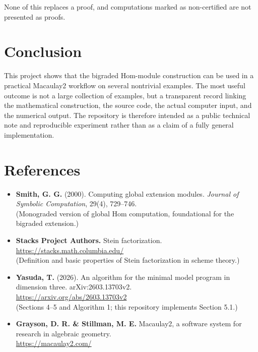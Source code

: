 \documentclass[11pt,reqno]{amsart}
\theoremstyle{plain}
\theoremstyle{definition}
\begin{document}
None of this replaces a proof, and computations marked as non-certified
are not presented as proofs.

\section{Conclusion}\label{sec:conclusion}

This project shows that the bigraded Hom-module construction can be used
in a practical Macaulay2 workflow on several nontrivial examples. The
most useful outcome is not a large collection of examples, but a
transparent record linking the mathematical construction, the source
code, the actual computer input, and the numerical output. The
repository is therefore intended as a public technical note and
reproducible experiment rather than as a claim of a fully general
implementation.

\section{References}\label{sec:references}

\begin{itemize}
\item
  \textbf{Smith, G. G.} (2000). Computing global extension modules.
  \emph{Journal of Symbolic Computation}, 29(4), 729--746.\\
  (Monograded version of global Hom computation, foundational for the
  bigraded extension.)
\item
  \textbf{Stacks Project Authors.} Stein factorization.\\
  \url{https://stacks.math.columbia.edu/}\\
  (Definition and basic properties of Stein factorization in scheme
  theory.)
\item
  \textbf{Yasuda, T.} (2026). An algorithm for the minimal model program
  in dimension three. arXiv:2603.13703v2.\\
  \url{https://arxiv.org/abs/2603.13703v2}\\
  (Sections 4--5 and Algorithm 1; this repository implements Section
  5.1.)
\item
  \textbf{Grayson, D. R. \& Stillman, M. E.} Macaulay2, a software
  system for research in algebraic geometry.\\
  \url{https://macaulay2.com/}
\end{itemize}
\end{document}
